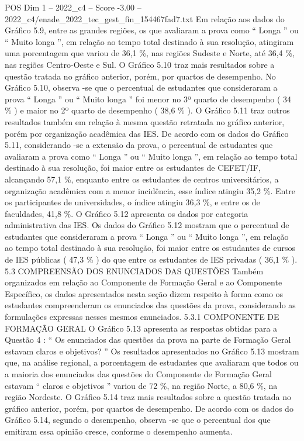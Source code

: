 \begin{textsample}{POS Dim 1 – 2022\_c4 – Score -3.00 – 2022\_c4/enade\_2022\_tec\_gest\_fin\_154467fad7.txt}
Em relação aos dados do Gráfico 5.9, entre as grandes regiões, os que avaliaram a prova como “ Longa ” ou “ Muito longa ”, em relação ao tempo total destinado à sua resolução, atingiram uma porcentagem que variou de 36,1 \%, nas regiões Sudeste e Norte, até 36,4 \%, nas regiões Centro-Oeste e Sul.
O Gráfico 5.10 traz mais resultados sobre a questão tratada no gráfico anterior, porém, por quartos de desempenho.
No Gráfico 5.10, observa -se que o percentual de estudantes que consideraram a prova “ Longa ” ou “ Muito longa ” foi menor no 3º quarto de desempenho ( 34 \% ) e maior no 2º quarto de desempenho ( 38,6 \% ).
O Gráfico 5.11 traz outros resultados também em relação à mesma questão retratada no gráfico anterior, porém por organização acadêmica das IES.
De acordo com os dados do Gráfico 5.11, considerando -se a extensão da prova, o percentual de estudantes que avaliaram a prova como “ Longa ” ou “ Muito longa ”, em relação ao tempo total destinado à sua resolução, foi maior entre os estudantes de CEFET/IF, alcançando 57,1 \%, enquanto entre os estudantes de centros universitários, a organização acadêmica com a menor incidência, esse índice atingiu 35,2 \%.
Entre os participantes de universidades, o índice atingiu 36,3 \%, e entre os de faculdades, 41,8 \%.
O Gráfico 5.12 apresenta os dados por categoria administrativa das IES.
Os dados do Gráfico 5.12 mostram que o percentual de estudantes que consideraram a prova “ Longa ” ou “ Muito longa ”, em relação ao tempo total destinado à sua resolução, foi maior entre os estudantes de cursos de IES públicas ( 47,3 \% ) do que entre os estudantes de IES privadas ( 36,1 \% ). 5.3 COMPREENSÃO DOS ENUNCIADOS DAS QUESTÕES Também organizados em relação ao Componente de Formação Geral e ao Componente Específico, os dados apresentados nesta seção dizem respeito à forma como os estudantes compreenderam os enunciados das questões da prova, considerando as formulações expressas nesses mesmos enunciados. 5.3.1 COMPONENTE DE FORMAÇÃO GERAL O Gráfico 5.13 apresenta as respostas obtidas para a Questão 4 : “ Os enunciados das questões da prova na parte de Formação Geral estavam claros e objetivos? ” Os resultados apresentados no Gráfico 5.13 mostram que, na análise regional, a porcentagem de estudantes que avaliaram que todos ou a maioria dos enunciados das questões do Componente de Formação Geral estavam “ claros e objetivos ” variou de 72 \%, na região Norte, a 80,6 \%, na região Nordeste.
O Gráfico 5.14 traz mais resultados sobre a questão tratada no gráfico anterior, porém, por quartos de desempenho.
De acordo com os dados do Gráfico 5.14, segundo o desempenho, observa -se que o percentual dos que emitiram essa opinião cresce, conforme o desempenho aumenta.

\end{textsample}
